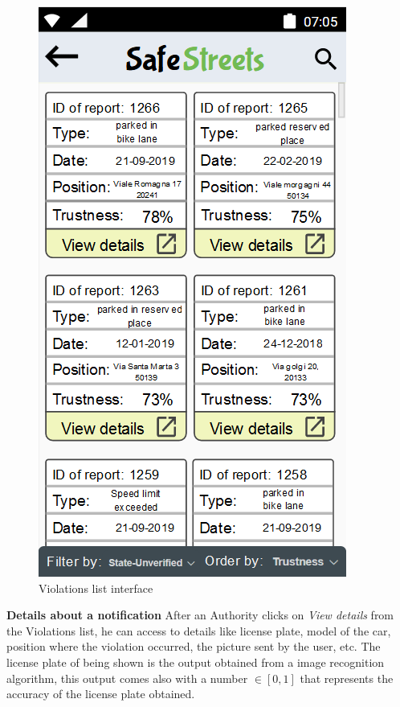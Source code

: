             \begin{figure}[h]
        \centering
        \includegraphics[scale=0.85]{Images/report_lists.png}
        \caption{Violations list interface}
    \end{figure}
    \newline
    \textbf{Details about a notification}\newline
    After an Authority clicks on \textit{View details} from the Violations list, he can access to details like license plate, model of the car, position where the violation occurred, the picture sent by the user, etc. The license plate of being shown is the output obtained from a image recognition algorithm, this output comes also with a number $\in [0,1]$ that represents the accuracy of the license plate obtained.
